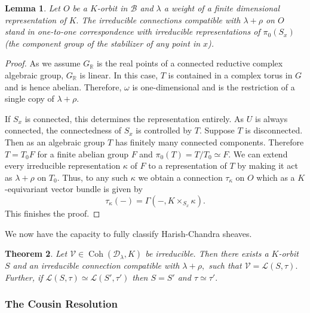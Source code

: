\documentclass[letterpaper,twosided,11pt]{article}
\theoremstyle{plain}
\newtheorem{theorem}{Theorem}[section]
\newtheorem{lemma}[theorem]{Lemma}
\theoremstyle{definition}
\theoremstyle{remark}
\newcommand{\R}{\mathbb{R}}
\newcommand{\script}[1]{\mathscr{#1}}
\begin{document}
\begin{lemma}
    \label{Classification_of_Connections} Let $ O $ be a $ K $-orbit in $
    \mathcal{B} $ and $ \lambda $ a weight of a finite dimensional
    representation of $ K. $ The irreducible connections compatible with
    $ \lambda+\rho $ on $ O $ stand in one-to-one correspondence with
    irreducible representations of $ \pi_0(S_x) $ (the component group
    of the stabilizer of any point in $ x $).
\end{lemma}
\begin{proof}
    As we assume $ G_\R $ is the real points of a connected reductive
    complex algebraic group, $ G_\R $ is linear.  In this case, $ T $ is
    contained in a complex torus in $ G $ and is hence abelian.
    Therefore, $ \omega $ is one-dimensional and is the restriction of a
    single copy of $ \lambda+\rho. $

    If $ S_x $ is connected, this determines the representation
    entirely.  As $ U $ is always connected, the connectedness of $ S_x $
    is controlled by $ T. $ Suppose $ T $ is disconnected.  Then as an
    algebraic group $ T $ has finitely many connected components.
    Therefore $ T=T_0F $ for a finite abelian group $ F $ and $ \pi_0(T)=T/T_0\simeq
    F. $ We can extend every irreducible representation $ \kappa $ of $
    F $ to a representation of $ T $ by making it act as $ \lambda+\rho $
    on $ T_0. $ Thus, to any such $ \kappa $ we obtain a connection $
    \tau_\kappa $ on $ O $ which as a $ K $-equivariant vector bundle is
    given by
    \[
        \tau_\kappa(-)=\Gamma(-, K\times_{S_x} \kappa).
    \]
    This finishes the proof.

\end{proof}

We now have the capacity to fully classify Harish-Chandra sheaves.

\begin{theorem}
    \cite{BeilinsonBernstein1993} Let $ \script{V}\in
    \operatorname{Coh}
    (\mathcal{D}_\lambda,K) $ be irreducible.  Then there exists a $ K $-orbit
    $ S $ and an irreducible connection compatible with $ \lambda+\rho, $
    such that $ \script{V}=\mathcal{L}(S,\tau). $ Further, if $ \mathcal
    {L}(S,\tau)\simeq \mathcal{L}(S',\tau') $ then $ S=S' $ and $ \tau\simeq\tau'.
    $
\end{theorem}


\subsubsection{The Cousin Resolution}
\end{document}
